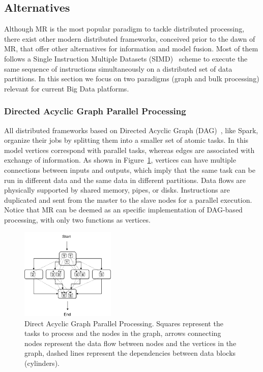 \documentclass[3p,review]{elsarticle}
\begin{document}


\subsection{Alternatives}\label{subsec:altMR}

Although MR is the most popular paradigm to tackle distributed processing, there exist other modern distributed frameworks, conceived prior to the dawn of MR, that offer other alternatives for information and model fusion. Most of them follows a Single Instruction Multiple Datasets (SIMD)~\cite{sung00} scheme to execute the same sequence of instructions simultaneously on a distributed set of data partitions. In this section we focus on two paradigms (graph and bulk processing) relevant for current Big Data platforms.

\subsubsection{Directed Acyclic Graph Parallel Processing}

All distributed frameworks based on Directed Acyclic Graph (DAG)~\cite{zaman13}, like Spark, organize their jobs by splitting them into a smaller set of atomic tasks. In this model vertices correspond with parallel tasks, whereas edges are associated with exchange of information. As shown in Figure~\ref{fig:dag}, vertices can have multiple connections between inputs and outputs, which imply that the same task can be run in different data and the same data in different partitions. Data flows are physically supported by shared memory, pipes, or disks. Instructions are duplicated and sent from the master to the slave nodes for a parallel execution. Notice that MR can be deemed as an specific implementation of DAG-based processing, with only two functions as vertices. 

\begin{figure}[htp]
    \centering
    \includegraphics[width=0.4\textwidth]{dag}
    \caption{Direct Acyclic Graph Parallel Processing. Squares represent the tasks to process and the nodes in the graph, arrows connecting nodes represent the data flow between nodes and the vertices in the graph, dashed lines represent the dependencies between data blocks (cylinders).}
    \label{fig:dag}
\end{figure}
\end{document}

